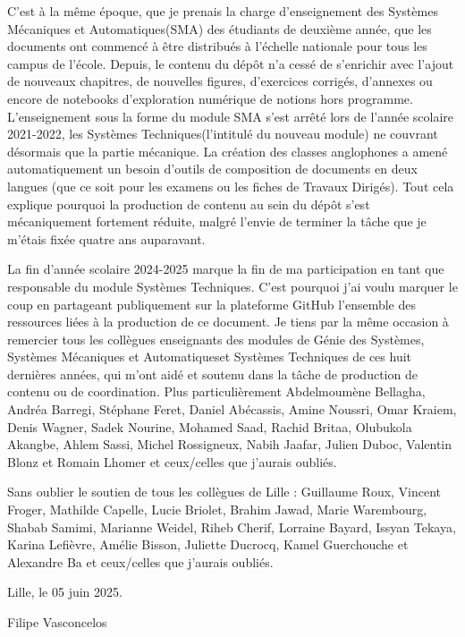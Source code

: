 C'est à la même époque, que je prenais la charge d'enseignement des 
\og Systèmes Mécaniques et Automatiques\fg (SMA)
des étudiants de deuxième année, que les documents ont commencé à être 
distribués à l'échelle nationale pour tous les campus de l'école.
Depuis, le contenu du dépôt n'a cessé de s'enrichir avec l'ajout
de nouveaux chapitres, de nouvelles figures, d'exercices corrigés, d'annexes
ou encore de notebooks d'exploration numérique de notions hors programme.
L'enseignement sous la forme du module SMA s'est arrêté lors de l'année
scolaire 2021-2022, les \og Systèmes Techniques\fg (l'intitulé du
nouveau module) ne couvrant désormais que la partie mécanique.
La création des classes anglophones a amené automatiquement un besoin
d'outils de composition de documents en deux langues (que ce soit pour 
les examens ou les fiches de \og Travaux Dirigés\fg). Tout cela explique 
pourquoi la production de contenu au sein du dépôt s'est mécaniquement 
fortement réduite, malgré l'envie de terminer la tâche que je m'étais 
fixée quatre ans auparavant.

La fin d'année scolaire 2024-2025 marque la fin de ma participation 
en tant que responsable du module \og Systèmes Techniques\fg. C'est pourquoi
j'ai voulu marquer le coup en partageant publiquement sur la plateforme GitHub
l'ensemble des ressources liées à la production de ce document.
Je tiens par la même occasion à remercier tous les collègues enseignants 
des modules de \og Génie des Systèmes\fg, 
\og Systèmes Mécaniques et Automatiques\fg et \og Systèmes Techniques\fg
de ces huit dernières années, qui m'ont aidé et soutenu dans la 
tâche de production de contenu ou de coordination. Plus particulièrement
Abdelmoumène Bellagha, Andréa Barregi, Stéphane Feret, Daniel Abécassis,
Amine Noussri, Omar Kraiem, Denis Wagner, Sadek Nourine, Mohamed Saad,
Rachid Britaa, Olubukola Akangbe, Ahlem Sassi, Michel Rossigneux,
Nabih Jaafar, Julien Duboc, Valentin Blonz et Romain Lhomer
et ceux/celles que j'aurais oubliés.

Sans oublier le soutien de tous les collègues de Lille :
Guillaume Roux, Vincent Froger, Mathilde Capelle, Lucie Briolet,
Brahim Jawad, Marie Warembourg, Shabab Samimi, Marianne Weidel,
Riheb Cherif, Lorraine Bayard, Issyan Tekaya, Karina Lefièvre, Amélie Bisson,
Juliette Ducrocq, Kamel Guerchouche et Alexandre Ba et ceux/celles 
que j'aurais oubliés.

\hspace{1cm}
\hfill Lille, le 05 juin 2025.

\hfill Filipe Vasconcelos
